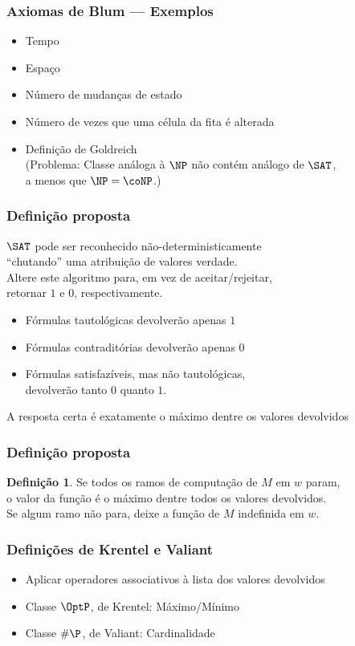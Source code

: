 \documentclass[utf8,notheorems]{beamer}
\theoremstyle{definition}
\newtheorem*{definition}{Definição}
\begin{document}
\begin{frame}
    \frametitle{Axiomas de Blum --- Exemplos}
    \begin{itemize}
        \item Tempo
        \item Espaço
        \item Número de mudanças de estado
        \item Número de vezes que uma célula da fita é alterada
        \item Definição de Goldreich \\
            (Problema: Classe análoga à $\NP$ não contém análogo de $\SAT$, \\
            a menos que $\NP = \coNP$.)
    \end{itemize}
\end{frame}

\begin{frame}
    \frametitle{Definição proposta}
    $\SAT$ pode ser reconhecido não-deterministicamente \\
    ``chutando'' uma atribuição de valores verdade. \\
    Altere este algoritmo para, em vez de aceitar/rejeitar, \\
    retornar $1$ e $0$, respectivamente.
    \begin{itemize}
        \item Fórmulas tautológicas devolverão apenas $1$
        \item Fórmulas contraditórias devolverão apenas $0$
        \item Fórmulas satisfazíveis, mas não tautológicas, \\
            devolverão tanto $0$ quanto $1$.
    \end{itemize}
    A resposta certa é exatamente o máximo dentre os valores devolvidos
\end{frame}

\begin{frame}
    \frametitle{Definição proposta}
    \begin{definition}
        Se todos os ramos de computação de $M$ em $w$ param, \\
        o valor da função é o máximo dentre todos os valores devolvidos. \\
        Se algum ramo não para, deixe a função de $M$ indefinida em $w$.
    \end{definition}
\end{frame}

\begin{frame}
    \frametitle{Definições de Krentel e Valiant}
    \begin{itemize}
        \item Aplicar operadores associativos à lista dos valores devolvidos
        \item Classe $\OptP$, de Krentel: Máximo/Mínimo \cite{Krentel1988}
        \item Classe $\#\P$, de Valiant: Cardinalidade \cite{Valiant1979}
    \end{itemize}
\end{frame}
\end{document}
